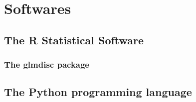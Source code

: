 \chapter{Softwares}


\section{The R Statistical Software}

\subsection{The glmdisc package}



\section{The Python programming language}


